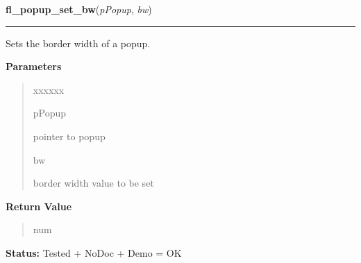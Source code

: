 \hspace{.8\funcindent}\begin{boxedminipage}{\funcwidth}

    \raggedright \textbf{fl\_popup\_set\_bw}(\textit{pPopup}, \textit{bw})

    \vspace{-1.5ex}

    \rule{\textwidth}{0.5\fboxrule}
\setlength{\parskip}{2ex}
    Sets the border width of a popup.

\setlength{\parskip}{1ex}
      \textbf{Parameters}
      \vspace{-1ex}

      \begin{quote}
        \begin{Ventry}{xxxxxx}

          \item[pPopup]

          pointer to popup

          \item[bw]

          border width value to be set

        \end{Ventry}

      \end{quote}

      \textbf{Return Value}
    \vspace{-1ex}

      \begin{quote}
      num

      \end{quote}

\textbf{Status:} Tested + NoDoc + Demo = OK



    \end{boxedminipage}

    \label{xformslib:library:fl_popup_get_color}

    \vspace{0.5ex}

